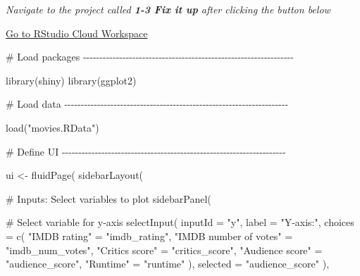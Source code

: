 \documentclass[
  letterpaper,
  DIV=11,
  numbers=noendperiod]{scrreprt}
\newenvironment{Shaded}{\begin{snugshade}}{\end{snugshade}}
\newcommand{\AttributeTok}[1]{\textcolor[rgb]{0.40,0.46,0.14}{#1}}
\newcommand{\CommentTok}[1]{\textcolor[rgb]{0.37,0.37,0.37}{#1}}
\newcommand{\FunctionTok}[1]{\textcolor[rgb]{0.28,0.35,0.67}{#1}}
\newcommand{\NormalTok}[1]{\textcolor[rgb]{0.00,0.46,0.62}{#1}}
\newcommand{\OtherTok}[1]{\textcolor[rgb]{0.00,0.46,0.62}{#1}}
\newcommand{\StringTok}[1]{\textcolor[rgb]{0.13,0.47,0.30}{#1}}
\begin{document}
\emph{Navigate to the project called \textbf{1-3 Fix it up} after
clicking the button below}

\href{https://rstudio.cloud/spaces/81721/join?access_code=I4VJaNsKfTqR3Td9hLP7E1nz8\%2FtMg6Xbw9Bgqumv}{
Go to RStudio Cloud Workspace}

\begin{Shaded}
\begin{Highlighting}[]
\CommentTok{\# Load packages {-}{-}{-}{-}{-}{-}{-}{-}{-}{-}{-}{-}{-}{-}{-}{-}{-}{-}{-}{-}{-}{-}{-}{-}{-}{-}{-}{-}{-}{-}{-}{-}{-}{-}{-}{-}{-}{-}{-}{-}{-}{-}{-}{-}{-}{-}{-}{-}{-}{-}{-}{-}{-}{-}{-}{-}{-}{-}{-}{-}{-}{-}{-}{-}}

\FunctionTok{library}\NormalTok{(shiny)}
\FunctionTok{library}\NormalTok{(ggplot2)}

\CommentTok{\# Load data {-}{-}{-}{-}{-}{-}{-}{-}{-}{-}{-}{-}{-}{-}{-}{-}{-}{-}{-}{-}{-}{-}{-}{-}{-}{-}{-}{-}{-}{-}{-}{-}{-}{-}{-}{-}{-}{-}{-}{-}{-}{-}{-}{-}{-}{-}{-}{-}{-}{-}{-}{-}{-}{-}{-}{-}{-}{-}{-}{-}{-}{-}{-}{-}{-}{-}{-}{-}}

\FunctionTok{load}\NormalTok{(}\StringTok{"movies.RData"}\NormalTok{)}

\CommentTok{\# Define UI {-}{-}{-}{-}{-}{-}{-}{-}{-}{-}{-}{-}{-}{-}{-}{-}{-}{-}{-}{-}{-}{-}{-}{-}{-}{-}{-}{-}{-}{-}{-}{-}{-}{-}{-}{-}{-}{-}{-}{-}{-}{-}{-}{-}{-}{-}{-}{-}{-}{-}{-}{-}{-}{-}{-}{-}{-}{-}{-}{-}{-}{-}{-}{-}{-}{-}{-}{-}}

\NormalTok{ui }\OtherTok{\textless{}{-}} \FunctionTok{fluidPage}\NormalTok{(}
  \FunctionTok{sidebarLayout}\NormalTok{(}

    \CommentTok{\# Inputs: Select variables to plot}
    \FunctionTok{sidebarPanel}\NormalTok{(}

      \CommentTok{\# Select variable for y{-}axis}
      \FunctionTok{selectInput}\NormalTok{(}
        \AttributeTok{inputId =} \StringTok{"y"}\NormalTok{,}
        \AttributeTok{label =} \StringTok{"Y{-}axis:"}\NormalTok{,}
        \AttributeTok{choices =} \FunctionTok{c}\NormalTok{(}
          \StringTok{"IMDB rating"} \OtherTok{=} \StringTok{"imdb\_rating"}\NormalTok{,}
          \StringTok{"IMDB number of votes"} \OtherTok{=} \StringTok{"imdb\_num\_votes"}\NormalTok{,}
          \StringTok{"Critics score"} \OtherTok{=} \StringTok{"critics\_score"}\NormalTok{,}
          \StringTok{"Audience score"} \OtherTok{=} \StringTok{"audience\_score"}\NormalTok{,}
          \StringTok{"Runtime"} \OtherTok{=} \StringTok{"runtime"}
\NormalTok{        ),}
        \AttributeTok{selected =} \StringTok{"audience\_score"}
\NormalTok{      ),}


\end{Highlighting}
\end{Shaded}
\end{document}
